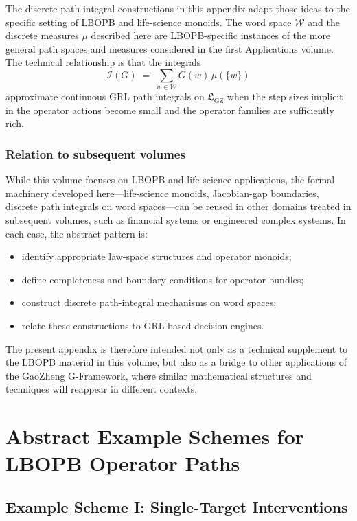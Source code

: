 \documentclass[11pt]{book}
\theoremstyle{plain}
\theoremstyle{definition}
\theoremstyle{remark}
\newcommand{\GZLS}{\ensuremath{\mathfrak{L}_{\mathrm{GZ}}}}       \newcommand{\GZLT}{\ensuremath{M_{!w}}}                           \newcommand{\GZLOC}{\ensuremath{A_M}}                             \newcommand{\GZLCurv}{\ensuremath{\mathcal{F}_{\mathrm{law}}}}
\begin{document}
The discrete path-integral constructions in this appendix adapt those
ideas to the specific setting of LBOPB and life-science monoids. The
word space $\mathcal{W}$ and the discrete measures $\mu$ described
here are LBOPB-specific instances of the more general path spaces and
measures considered in the first Applications volume. The technical
relationship is that the integrals
\[
  \mathcal{I}(G)
  \;=\;
  \sum_{w \in \mathcal{W}} G(w)\, \mu(\{w\})
\]
approximate continuous GRL path integrals on $\GZLS$ when the step
sizes implicit in the operator actions become small and the operator
families are sufficiently rich.

\subsection*{Relation to subsequent volumes}

While this volume focuses on LBOPB and life-science applications, the
formal machinery developed here—life-science monoids, Jacobian-gap
boundaries, discrete path integrals on word spaces—can be reused in
other domains treated in subsequent volumes, such as financial systems
or engineered complex systems. In each case, the abstract pattern is:

\begin{itemize}
  \item identify appropriate law-space structures and operator monoids;
  \item define completeness and boundary conditions for operator
        bundles;
  \item construct discrete path-integral mechanisms on word spaces;
  \item relate these constructions to GRL-based decision engines.
\end{itemize}

The present appendix is therefore intended not only as a technical
supplement to the LBOPB material in this volume, but also as a bridge
to other applications of the GaoZheng G-Framework, where similar
mathematical structures and techniques will reappear in different
contexts.

\chapter{Abstract Example Schemes for LBOPB Operator Paths}


\section{Example Scheme I: Single-Target Interventions}
\end{document}

